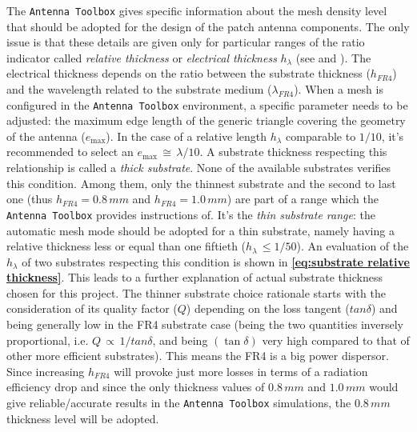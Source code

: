 \documentclass[10 pt,a4paper,twocolumn]{article}
\begin{document}
{	%

The \texttt{\color{Mahogany}Antenna Toolbox} gives specific
information about the mesh density level that should be adopted for the design of the patch antenna components. The only issue is that these details are given only for particular ranges of the ratio indicator called \emph{relative thickness} or \emph{electrical thickness} $h_{\lambda}$ (see \textbf{\cite{makarov}} and \textbf{\cite{meshing}}). The electrical thickness depends on the ratio between the substrate thickness ($h_{FR4}$) and the wavelength related to the substrate medium ($\lambda_{FR4}$). When a mesh is configured in the \texttt{\color{Mahogany}Antenna Toolbox} environment, a specific parameter needs to be adjusted: the maximum edge length of the generic triangle covering the geometry of the antenna ($e_{\max}$). In the case of a relative length $h_\lambda$ comparable to $1/10$, it's recommended to select an $e_{\max}\,\cong\,\lambda/10$. A substrate thickness respecting this relationship is called a \emph{thick substrate}. None of the available substrates verifies this condition. Among them, only the thinnest substrate and the second to last one (thus $h_{FR4}=0.8\,mm$ and $h_{FR4}=1.0\,mm$) are part of a range which the \texttt{\color{Mahogany}Antenna Toolbox} provides instructions of. It's the \emph{thin substrate range}: the automatic mesh mode should be adopted for a thin substrate, namely having a relative thickness less or equal than one fiftieth ($h_\lambda\,\leq{1/50}$). An evaluation of the $h_\lambda$ of two substrates respecting this condition is shown in \textbf{\cref{eq:substrate relative thickness}}. This leads to a further explanation of actual substrate thickness chosen for this project. The thinner substrate choice rationale starts with the consideration of its quality factor ($Q$) depending on the loss tangent ($tan\delta$) and being generally low in the FR4 substrate case (being the two quantities inversely proportional, i.e. $Q\,\propto\,1/tan\delta$, and being $(\tan\delta)$ very high compared to that of other more efficient substrates). This means the FR4 is a big power dispersor. Since increasing $h_{FR4}$ will provoke just more losses in terms of a radiation efficiency drop and since the only thickness values of $0.8\,mm$ and $1.0\,mm$ would give reliable/accurate results in the \texttt{\color{Mahogany}Antenna Toolbox} simulations, the $0.8\,mm$ thickness level will be adopted. 
}
\end{document}
